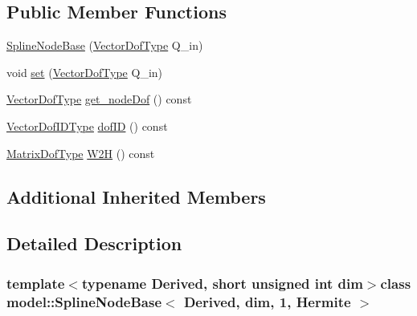 \subsection*{Public Member Functions}
\begin{DoxyCompactItemize}
\item 
\hyperlink{classmodel_1_1_spline_node_base_3_01_derived_00_01dim_00_011_00_01_hermite_01_4_a48fc093a1362fc1362b29bfa6d1bcdaa}{Spline\+Node\+Base} (\hyperlink{classmodel_1_1_spline_node_base_3_01_derived_00_01dim_00_011_00_01_hermite_01_4_aca76e4dc4ac650d8fc7ae0b4c2bfa115}{Vector\+Dof\+Type} Q\+\_\+in)
\item 
void \hyperlink{classmodel_1_1_spline_node_base_3_01_derived_00_01dim_00_011_00_01_hermite_01_4_a37a05a253c7c4ab3ff7ffeb61bd518cb}{set} (\hyperlink{classmodel_1_1_spline_node_base_3_01_derived_00_01dim_00_011_00_01_hermite_01_4_aca76e4dc4ac650d8fc7ae0b4c2bfa115}{Vector\+Dof\+Type} Q\+\_\+in)
\item 
\hyperlink{classmodel_1_1_spline_node_base_3_01_derived_00_01dim_00_011_00_01_hermite_01_4_aca76e4dc4ac650d8fc7ae0b4c2bfa115}{Vector\+Dof\+Type} \hyperlink{classmodel_1_1_spline_node_base_3_01_derived_00_01dim_00_011_00_01_hermite_01_4_af2fe221e697cb5582a691f1b1a3a4023}{get\+\_\+node\+Dof} () const 
\item 
\hyperlink{classmodel_1_1_spline_node_base_3_01_derived_00_01dim_00_011_00_01_hermite_01_4_a3b6d0c33098f2d713c2ac7327a714190}{Vector\+Dof\+I\+D\+Type} \hyperlink{classmodel_1_1_spline_node_base_3_01_derived_00_01dim_00_011_00_01_hermite_01_4_adb37788437ab05d528567e3c1ecd8d44}{dof\+I\+D} () const 
\item 
\hyperlink{classmodel_1_1_spline_node_base_3_01_derived_00_01dim_00_011_00_01_hermite_01_4_a6ff56666ddaf60f664205a307851c12a}{Matrix\+Dof\+Type} \hyperlink{classmodel_1_1_spline_node_base_3_01_derived_00_01dim_00_011_00_01_hermite_01_4_a90eb832f971aa3d68abfd1210a50dd1d}{W2\+H} () const 
\end{DoxyCompactItemize}
\subsection*{Additional Inherited Members}


\subsection{Detailed Description}
\subsubsection*{template$<$typename Derived, short unsigned int dim$>$class model\+::\+Spline\+Node\+Base$<$ Derived, dim, 1, Hermite $>$}



